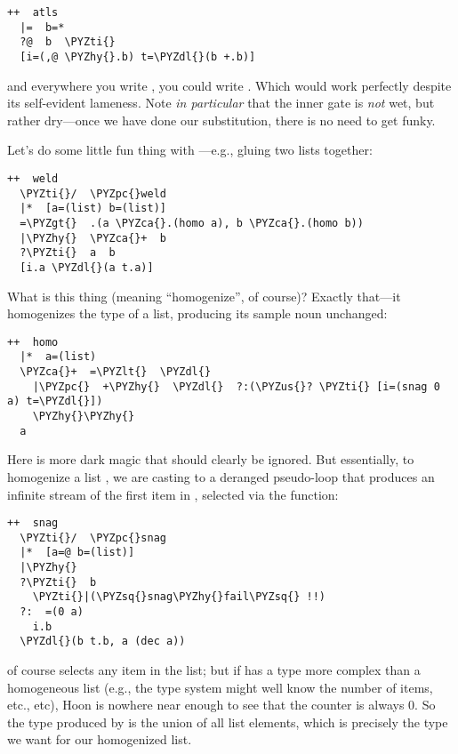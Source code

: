 \begin{framed_shaded}
\begin{Verbatim}[fontsize=\relsize{-2.5},fontseries=b,commandchars=\\\{\}]
++  atls
  |=  b=*
  ?@  b  \PYZti{}
  [i=(,@ \PYZhy{}.b) t=\PYZdl{}(b +.b)]
\end{Verbatim}
\end{framed_shaded}
and everywhere you write , you could write .
Which would work perfectly despite its self-evident lameness.
Note \emph{in particular} that the inner  gate is \emph{not} wet, but
rather dry---once we have done our substitution, there is no need
to get funky.

Let's do some little fun thing with ---e.g., gluing two lists
together:

\begin{framed_shaded}
\begin{Verbatim}[fontsize=\relsize{-2.5},fontseries=b,commandchars=\\\{\}]
++  weld
  \PYZti{}/  \PYZpc{}weld
  |*  [a=(list) b=(list)]
  =\PYZgt{}  .(a \PYZca{}.(homo a), b \PYZca{}.(homo b))
  |\PYZhy{}  \PYZca{}+  b
  ?\PYZti{}  a  b
  [i.a \PYZdl{}(a t.a)]
\end{Verbatim}
\end{framed_shaded}
What is this  thing (meaning ``homogenize'', of course)?
Exactly that---it homogenizes the type of a list, producing its
sample noun unchanged:

\begin{framed_shaded}
\begin{Verbatim}[fontsize=\relsize{-2.5},fontseries=b,commandchars=\\\{\}]
++  homo
  |*  a=(list)
  \PYZca{}+  =\PYZlt{}  \PYZdl{}
    |\PYZpc{}  +\PYZhy{}  \PYZdl{}  ?:(\PYZus{}? \PYZti{} [i=(snag 0 a) t=\PYZdl{}])
    \PYZhy{}\PYZhy{}
  a
\end{Verbatim}
\end{framed_shaded}
Here is more dark magic that should clearly be ignored.  But
essentially, to homogenize a list , we are casting  to a
deranged pseudo-loop that produces an infinite stream of the
first item in , selected via the  function:

\begin{framed_shaded}
\begin{Verbatim}[fontsize=\relsize{-2.5},fontseries=b,commandchars=\\\{\}]
++  snag
  \PYZti{}/  \PYZpc{}snag
  |*  [a=@ b=(list)]
  |\PYZhy{}
  ?\PYZti{}  b
    \PYZti{}|(\PYZsq{}snag\PYZhy{}fail\PYZsq{} !!)
  ?:  =(0 a)
    i.b
  \PYZdl{}(b t.b, a (dec a))
\end{Verbatim}
\end{framed_shaded}
 of course selects any item in the list; but if  has a
type more complex than a homogeneous list (e.g., the type system
might well know the number of items, etc., etc), Hoon is nowhere
near enough to see that the counter is always 0.  So the type
produced by  is the union of all list elements, which is
precisely the type we want for our homogenized list.

